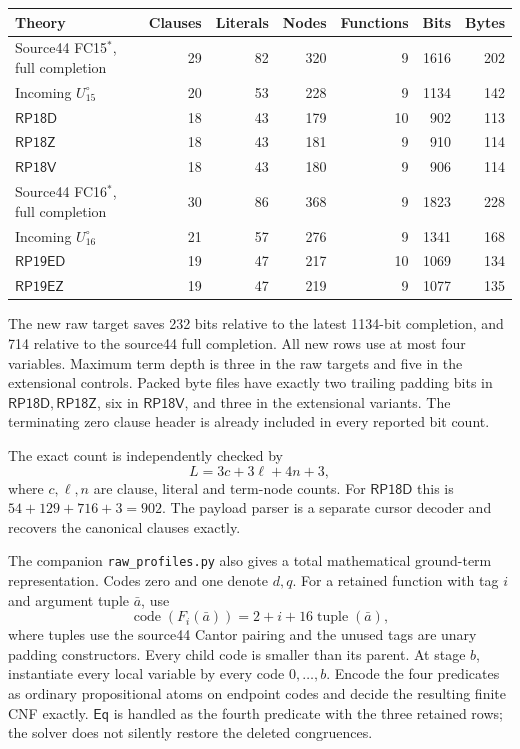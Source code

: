 \documentclass[11pt]{article}
\newcommand{\Eq}{\mathsf{Eq}}
\newcommand{\RP}{\mathsf{RP18D}}
\newcommand{\RPZ}{\mathsf{RP18Z}}
\newcommand{\RPV}{\mathsf{RP18V}}
\newcommand{\RPE}{\mathsf{RP19ED}}
\newcommand{\RPEZ}{\mathsf{RP19EZ}}
\begin{document}
\begin{center}\small
\begin{tabular}{lrrrrrr}
\toprule
Theory & Clauses & Literals & Nodes & Functions & Bits & Bytes\\
\midrule
Source44 FC15$^*$, full completion &29&82&320&9&1616&202\\
Incoming $U_{15}^{\circ}$ &20&53&228&9&1134&142\\
$\RP$ &18&43&179&10&902&113\\
$\RPZ$ &18&43&181&9&910&114\\
$\RPV$ &18&43&180&9&906&114\\
\midrule
Source44 FC16$^*$, full completion &30&86&368&9&1823&228\\
Incoming $U_{16}^{\circ}$ &21&57&276&9&1341&168\\
$\RPE$ &19&47&217&10&1069&134\\
$\RPEZ$ &19&47&219&9&1077&135\\
\bottomrule
\end{tabular}
\end{center}
The new raw target saves 232 bits relative to the latest 1134-bit
completion, and 714 relative to the source44 full completion. All new
rows use at most four variables. Maximum term depth is three in the
raw targets and five in the extensional controls. Packed byte files
have exactly two trailing padding bits in $\RP,\RPZ$, six in $\RPV$,
and three in the extensional variants. The terminating zero clause header is already
included in every reported bit count.

The exact count is independently checked by
\[
 L=3c+3\ell+4n+3,
\]
where $c,\ell,n$ are clause, literal and term-node counts. For $\RP$
this is $54+129+716+3=902$. The payload parser is a separate cursor
decoder and recovers the canonical clauses exactly.

The companion \texttt{raw\_profiles.py} also gives a total mathematical
ground-term representation. Codes zero and one denote $d,q$. For a
retained function with tag $i$ and argument tuple $\bar a$, use
\[
 \operatorname{code}(F_i(\bar a))=2+i+16\operatorname{tuple}(\bar a),
\]
where tuples use the source44 Cantor pairing and the unused tags are
unary padding constructors. Every child code is smaller than its
parent. At stage $b$, instantiate every local variable by every code
$0,\ldots,b$. Encode the four predicates as ordinary propositional
atoms on endpoint codes and decide the resulting finite CNF exactly.
$\Eq$ is handled as the fourth predicate with the three retained rows;
the solver does not silently restore the deleted congruences.
\end{document}
